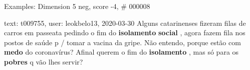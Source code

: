 \begin{frame}{Examples: Dimension 5 neg, score -4, \# 000008}
\footnotesize
\begin{alertblock}{text: t009755, user: leokbelo13, 2020-03-30}
Alguns catarinenses fizeram filas de carros em passeata pedindo o fim do 
\textbf{isolamento} \textbf{social} , agora fazem fila nos postos de saúde p / 
tomar a vacina da gripe. Não entendo, porque estão com \textbf{medo} do 
coronavírus? Afinal querem o fim do \textbf{isolamento} , mas só para os 
\textbf{pobres} q vão lhes servir? 
\end{alertblock}
\end{frame}
